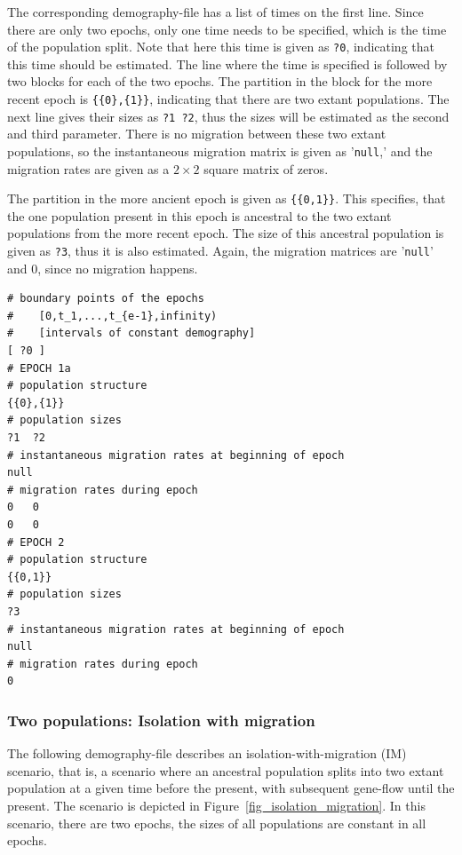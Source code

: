 \documentclass{article}
\numberwithin{equation}{section}
\begin{document}
The corresponding demography-file has a list of times on the first line. Since there are only two epochs, only one time needs to be specified, which is the time of the population split. Note that here this time is given as \texttt{?0}, indicating that this time should be estimated. The line where the time is specified is followed by two blocks for each of the two epochs. The partition in the block for the more recent epoch is \texttt{\{\{0\},\{1\}\}}, indicating that there are two extant populations. The next line gives their sizes as \texttt{?1 ?2}, thus the sizes will be estimated as the second and third parameter. There is no migration between these two extant populations, so the instantaneous migration matrix is given as '\texttt{null},' and the migration rates are given as a $2 \times 2$ square matrix of zeros.

The partition in the more ancient epoch is given as \texttt{\{\{0,1\}\}}. This specifies, that the one population present in this epoch is ancestral to the two extant populations from the more recent epoch. The size of this ancestral population is given as \texttt{?3}, thus it is also estimated. Again, the migration matrices are '\texttt{null}' and 0, since no migration happens.

\begin{verbatim}
# boundary points of the epochs
#    [0,t_1,...,t_{e-1},infinity)
#    [intervals of constant demography]
[ ?0 ]
# EPOCH 1a
# population structure
{{0},{1}}
# population sizes
?1	?2
# instantaneous migration rates at beginning of epoch
null
# migration rates during epoch
0	0
0	0
# EPOCH 2
# population structure
{{0,1}}
# population sizes
?3
# instantaneous migration rates at beginning of epoch
null
# migration rates during epoch
0
\end{verbatim}

\subsubsection{Two populations: Isolation with migration}
\label{sec_demo_isolation_migration}


The following demography-file describes an isolation-with-migration (IM) scenario, that is, a scenario where an ancestral population splits into two extant population at a given time before the present, with subsequent gene-flow until the present. The scenario is depicted in Figure~\ref{fig_isolation_migration}. In this scenario, there are two epochs, the sizes of all populations are constant in all epochs.
\end{document}
